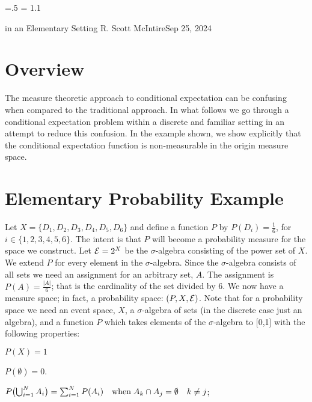 




\parindent=0pt
\parskip=.5\baselineskip
\baselineskip = 1.1\baselineskip

\footline{\hss\tenrm\folio\hss}

        {in an Elementary Setting}
{R. Scott McIntire}{Sep 25, 2024}

\section{Overview}
The measure theoretic approach to conditional expectation can be confusing
when compared to the traditional approach.
In what follows we go through a conditional 
expectation problem within a discrete and familiar setting in an attempt 
to reduce this confusion. In the example shown, we show explicitly that the 
conditional expectation function is non-measurable in the origin 
measure space.


\section{Elementary Probability Example}
Let $X = \{D_1, D_2, D_3, D_4, D_5, D_6\}$ and define a function $P$ by 
$P(D_i) = \frac{1}{6}$, for $i\in \{1,2,3,4,5,6\}$. The intent is that $P$ will 
become a probability measure for the space we construct.
Let ${\cal E} = 2^X$ be the $\sigma$-algebra 
consisting of the power set of $X$. We extend $P$ for every element in the $\sigma$-algebra.
Since the $\sigma$-algebra consists of all sets 
we need an assignment for an arbitrary set, $A$. 
The assignment is $P(A) = \frac{|A|}{6}$; that is the cardinality of the set divided by 6.
We now have a measure space; in fact, a probability space: $(P,X,{\cal E})$.
Note that for a probability space we need an event space, $X$, a $\sigma$-algebra of sets 
(in the discrete case just an algebra), and a function $P$ which takes 
elements of the $\sigma$-algebra to [0,1] with the following properties:

\beginEnum
\item{$P(X) = 1$}
\item{$P(\emptyset) = 0$.}
\item{$
P\bigl(\mathop{\bigcup}_{i=1}^N A_i\bigr) = \sum_{i=1}^N P(A_i) 
\quad {\rm when}\;  A_k \cap A_j = \emptyset \quad k\neq j
$;}
\endEnum

